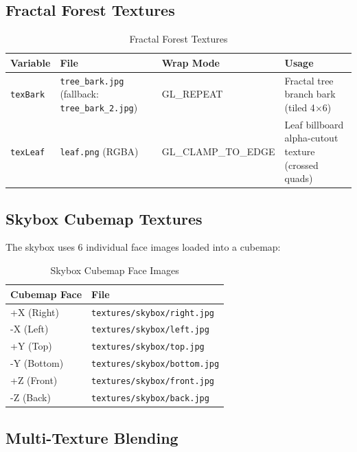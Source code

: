 \documentclass[12pt,a4paper]{article}
\begin{document}
\subsection{Fractal Forest Textures}

\begin{table}[H]
\centering
\begin{tabular}{lllp{5.5cm}}
\toprule
\textbf{Variable} & \textbf{File} & \textbf{Wrap Mode} & \textbf{Usage} \\
\midrule
\texttt{texBark} & \texttt{tree\_bark.jpg} (fallback: \texttt{tree\_bark\_2.jpg}) & GL\_REPEAT & Fractal tree branch bark (tiled 4$\times$6) \\
\texttt{texLeaf} & \texttt{leaf.png} (RGBA) & GL\_CLAMP\_TO\_EDGE & Leaf billboard alpha-cutout texture (crossed quads) \\
\bottomrule
\end{tabular}
\caption{Fractal Forest Textures}
\end{table}

\subsection{Skybox Cubemap Textures}

The skybox uses 6 individual face images loaded into a cubemap:

\begin{table}[H]
\centering
\begin{tabular}{ll}
\toprule
\textbf{Cubemap Face} & \textbf{File} \\
\midrule
+X (Right)  & \texttt{textures/skybox/right.jpg} \\
-X (Left)   & \texttt{textures/skybox/left.jpg} \\
+Y (Top)    & \texttt{textures/skybox/top.jpg} \\
-Y (Bottom) & \texttt{textures/skybox/bottom.jpg} \\
+Z (Front)  & \texttt{textures/skybox/front.jpg} \\
-Z (Back)   & \texttt{textures/skybox/back.jpg} \\
\bottomrule
\end{tabular}
\caption{Skybox Cubemap Face Images}
\end{table}

\subsection{Multi-Texture Blending}
\end{document}

